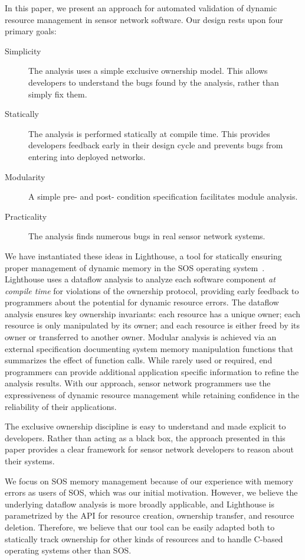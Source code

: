 In this paper, we present an approach for automated validation of dynamic
resource management in sensor network software.  
%
Our design rests upon four primary goals:
%
\begin{description}
%
\item[Simplicity]  The analysis uses a simple exclusive ownership model.
%
This allows developers to understand the bugs found by the analysis, rather
than simply fix them.
%
\item[Statically] The analysis is performed statically at compile time.  This
provides developers feedback early in their design cycle and prevents bugs
from entering into deployed networks.
%
\item[Modularity]  A simple pre- and post- condition specification
facilitates module analysis.
%
\item[Practicality] The analysis finds numerous bugs in real sensor network
systems.
%
\end{description}
%



We have instantiated these ideas in Lighthouse, a tool for statically
ensuring proper management of dynamic memory in the SOS operating
system~\cite{sos}.  
%
Lighthouse uses a dataflow analysis to analyze each software component {\em
at compile time} for violations of the ownership protocol, providing early
feedback to programmers about the potential for dynamic resource errors.  
%
The dataflow analysis ensures key ownership invariants:  each resource has a
unique owner; each resource is only manipulated by its owner; and each
resource is either freed by its owner or transferred to another owner.  
%
Modular analysis is achieved via an external specification documenting
system memory manipulation functions that summarizes the effect of function
calls.
%
While rarely used or required, end programmers can provide additional
application specific information to refine the analysis results.
%
With our approach, sensor network programmers use the expressiveness of
dynamic resource management while retaining confidence in the reliability of
their applications.



The exclusive ownership discipline is easy to understand and made explicit to
developers.
%
Rather than acting as a black box, the approach presented in this paper
provides a clear framework for sensor network developers to reason about
their systems.


We focus on SOS memory management because of our experience with memory
errors as users of SOS, which was our initial motivation.  
%
However, we believe the underlying dataflow analysis is more broadly
applicable, and Lighthouse is parametrized by the API for resource creation,
ownership transfer, and resource deletion.  
%
Therefore, we believe that our tool can be easily adapted both to statically
track ownership for other kinds of resources and to handle C-based operating
systems other than SOS.



